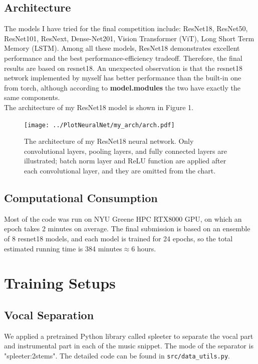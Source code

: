 \documentclass{article}
\begin{document}
    \subsection*{Architecture}
    The models I have tried for the final competition include: ResNet18, ResNet50, ResNet101, ResNext, Dense-Net201, Vision Transformer (ViT), Long Short Term Memory (LSTM).
    Among all these models, ResNet18 demonstrates excellent performance and the best performance-efficiency tradeoff. Therefore, the final results are based on resnet18. An unexpected observation is that the resnet18 network implemented by myself has better performance than the built-in one from torch, although according to \textbf{model.modules} the two have exactly the same components.\\
    The architecture of my ResNet18 model is shown in Figure 1.
    \begin{figure}[hbt!]
        \centering
        \texttt{[image: ../PlotNeuralNet/my\_arch/arch.pdf]}
        \caption{The architecture of my ResNet18 neural network. Only convolutional layers, pooling layers, and fully connected layers are illustrated; batch norm layer and ReLU function are applied after each convolutional layer, and they are omitted from the chart.}
    \end{figure}

    \subsection*{Computational Consumption}
    Most of the code was run on NYU Greene HPC RTX8000 GPU, on which an epoch takes 2 minutes on average. The final submission is based on an ensemble of 8 resnet18 models, and each model is trained for 24 epochs, so the total estimated running time is 384 minutes$\approx$6 hours.

    \newpage{}
    \section{Training Setups}

    \subsection*{Vocal Separation}
    We applied a pretrained Python library called spleeter to separate the vocal part and instrumental part in each of the music snippet. The mode of the separator is "spleeter:2stems". The detailed code can be found in \texttt{src/data\_utils.py}.
\end{document}

